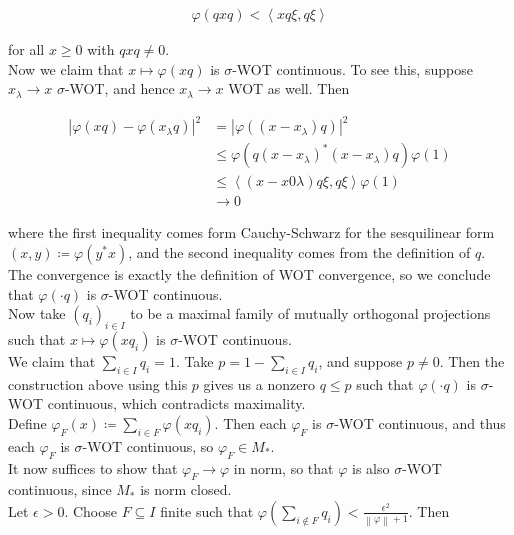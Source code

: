 \documentclass[a4paper,10pt]{report}
\begin{document}
\begin{enumerate}
		\begin{align*}
				\varphi \left( q x q \right) < \left\langle x q \xi , q \xi \right\rangle
		\end{align*}

		for all $x \geq 0$ with $q x q \neq 0$.\\
		Now we claim that $x \mapsto \varphi \left( x q \right)$ is $\sigma$-WOT continuous.  To see this, suppose $x_\lambda \to x$ $\sigma$-WOT, and hence $x_\lambda \to x$ WOT as well.  Then

		\begin{align*}
				\left| \varphi \left( x q \right) - \varphi \left( x_\lambda q \right) \right|^2%
				&= \left| \varphi \left( \left( x - x_\lambda \right) q \right) \right|^2\\
				&\leq \varphi \left( q \left( x - x_\lambda \right)^* \left( x - x_\lambda \right) q \right) \varphi \left( 1 \right)\\
				&\leq \left\langle \left( x - x0\lambda \right) q \xi , q \xi \right\rangle \varphi \left( 1 \right)\\
				&\to 0
		\end{align*}

		where the first inequality comes form Cauchy-Schwarz for the sesquilinear form $\left( x , y \right) \coloneq \varphi \left( y^* x \right)$, and the second inequality comes from the definition of $q$.  The convergence is exactly the definition of WOT convergence, so we conclude that $\varphi \left( \cdot q \right)$ is $\sigma$-WOT continuous.\\
		Now take $\left( q_i \right)_{i \in I}$ to be a maximal family of mutually orthogonal projections such that $x \mapsto \varphi \left( x q_i \right)$ is $\sigma$-WOT continuous.\\
		We claim that $\sum_{i \in I} q_i = 1$.  Take $p = 1 - \sum_{i \in I} q_i$, and suppose $p \neq 0$.  Then the construction above using this $p$ gives us a nonzero $q \leq p$ such that $\varphi \left( \cdot q \right)$ is $\sigma$-WOT continuous, which contradicts maximality.\\
		Define $\varphi_F \left( x \right) \coloneq \sum_{i \in F} \varphi \left( x q_i \right)$.  Then each $\varphi_F$ is $\sigma$-WOT continuous, and thus each $\varphi_F$ is $\sigma$-WOT continuous, so $\varphi_F \in M_*$.\\
		It now suffices to show that $\varphi_F \to \varphi$ in norm, so that $\varphi$ is also $\sigma$-WOT continuous, since $M_*$ is norm closed.\\
		Let $\epsilon > 0$.  Choose $F \subseteq I$ finite such that $\varphi \left( \sum_{i \notin F} q_i \right) < \frac{\epsilon^2}{\left\| \varphi \right\| + 1}$.  Then


\end{enumerate}
\end{document}
